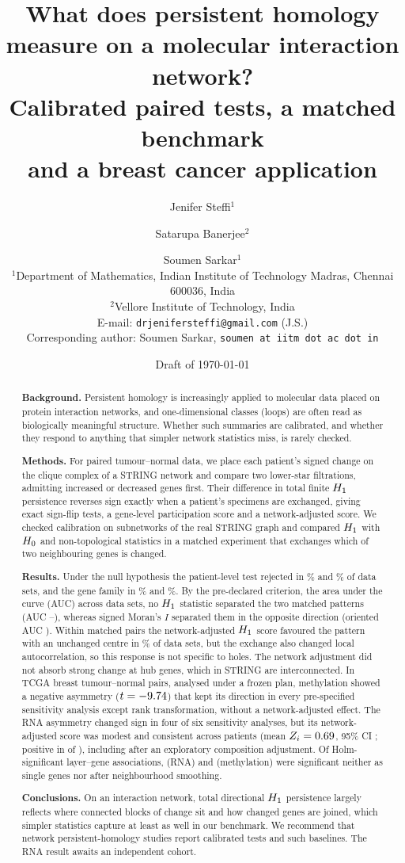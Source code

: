 \documentclass[11pt,a4paper]{article}
\title{What does persistent homology measure on a molecular interaction network?\\
Calibrated paired tests, a matched benchmark\\ and a breast cancer application}
\author{Jenifer Steffi$^{1}$ \and Satarupa Banerjee$^{2}$ \and Soumen Sarkar$^{1}$ \\[4pt]
\small $^{1}$Department of Mathematics, Indian Institute of Technology Madras, Chennai 600036, India\\
\small $^{2}$Vellore Institute of Technology, India \todo{department and city}\\[2pt]
\small E-mail: \texttt{drjenifersteffi@gmail.com} (J.S.)\\
\small Corresponding author: Soumen Sarkar, \texttt{soumen at iitm dot ac dot in}}
\date{Draft of \today}
\begin{document}
\maketitle

\begin{abstract}
\noindent\textbf{Background.} Persistent homology is increasingly applied to molecular data placed on protein interaction networks, and one-dimensional classes (loops) are often read as biologically meaningful structure. Whether such summaries are calibrated, and whether they respond to anything that simpler network statistics miss, is rarely checked.

\noindent\textbf{Methods.} For paired tumour--normal data, we place each patient's signed change on the clique complex of a STRING network and compare two lower-star filtrations, admitting increased or decreased genes first. Their difference in total finite $H_{1}$ persistence reverses sign exactly when a patient's specimens are exchanged, giving exact sign-flip tests, a gene-level participation score and a network-adjusted score. We checked calibration on subnetworks of the real STRING graph and compared $H_{1}$ with $H_{0}$ and non-topological statistics in a matched experiment that exchanges which of two neighbouring genes is changed.

\noindent\textbf{Results.} Under the null hypothesis the patient-level test rejected in \calNormalL\% and \calOutliersL\% of data sets, and the gene family in \calNormalG\% and \calOutliersG\%. By the pre-declared criterion, the area under the curve (AUC) across data sets, no $H_{1}$ statistic separated the two matched patterns (AUC \aucHMin--\aucHMax), whereas signed Moran's $I$ separated them in the opposite direction (oriented AUC \aucOrBtwoTwo). Within matched pairs the network-adjusted $H_{1}$ score favoured the pattern with an unchanged centre in \pairZTwo\% of data sets, but the exchange also changed local autocorrelation, so this response is not specific to holes. The network adjustment did not absorb strong change at hub genes, which in STRING are interconnected. In \tcgaN{} TCGA breast tumour--normal pairs, analysed under a frozen plan, methylation showed a negative asymmetry ($t=-9.74$) that kept its direction in every pre-specified sensitivity analysis except rank transformation, without a network-adjusted effect. The RNA asymmetry changed sign in four of six sensitivity analyses, but its network-adjusted score was modest and consistent across patients (mean $Z_i=0.69$, 95\% CI \ZciRna; positive in \ZposRna{} of \tcgaN), including after an exploratory composition adjustment. Of \geneSig{} Holm-significant layer--gene associations, \audNotBothRna{} (RNA) and \audNotBothMeth{} (methylation) were significant neither as single genes nor after neighbourhood smoothing.

\noindent\textbf{Conclusions.} On an interaction network, total directional $H_{1}$ persistence largely reflects where connected blocks of change sit and how changed genes are joined, which simpler statistics capture at least as well in our benchmark. We recommend that network persistent-homology studies report calibrated tests and such baselines. The RNA result awaits an independent cohort.
\end{abstract}
\end{document}
